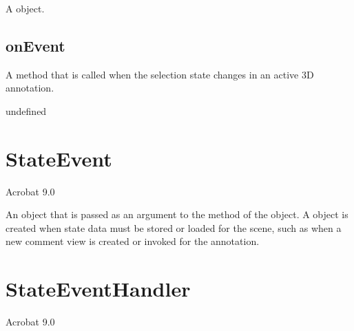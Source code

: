 \documentclass[letterpaper,12pt,english,openany,oneside]{sphinxmanual}
\begin{document}
\label{\detokenize{JS_3D_API:syntax-117}}

\begin{sphinxVerbatim}[commandchars=\\\{\}]
 
\end{sphinxVerbatim}
\label{\detokenize{JS_3D_API:returns-118}}

A  object.


\subsection{onEvent}
\label{\detokenize{JS_3D_API:onevent-7}}\label{\detokenize{JS_3D_API:id35}}
A method that is called when the selection state changes in an active 3D annotation.

\label{\detokenize{JS_3D_API:syntax-118}}

\begin{sphinxVerbatim}[commandchars=\\\{\}]
\end{sphinxVerbatim}
\label{\detokenize{JS_3D_API:parameters-85}}

\label{\detokenize{JS_3D_API:section-118}}\label{\detokenize{JS_3D_API:returns-119}}

undefined


\section{StateEvent}
\label{\detokenize{JS_3D_API:stateevent}}
Acrobat 9.0

An object that is passed as an argument to the  method of the  object. A  object is created when state data must be stored or loaded for the scene, such as when a new comment view is created or invoked for the annotation.

\label{\detokenize{JS_3D_API:properties-30}}


\section{StateEventHandler}
\label{\detokenize{JS_3D_API:stateeventhandler}}
Acrobat 9.0
\end{document}
